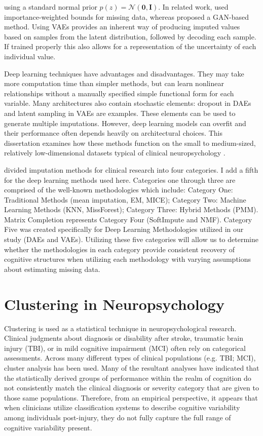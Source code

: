 using a standard normal prior $p(z)=\mathcal{N}(\mathbf{0},\mathbf{I})$. In related work, \parencite{mattei2019miwae} used importance-weighted bounds for missing data, whereas \parencite{yoon2018gain} proposed a GAN-based method. Using VAEs provides an inherent way of producing imputed values based on samples from the latent distribution, followed by decoding each sample. If trained properly this also allows for a representation of the uncertainty of each individual value.

Deep learning techniques have advantages and disadvantages. They may take more computation time than simpler methods, but can learn nonlinear relationships without a manually specified simple functional form for each variable. Many architectures also contain stochastic elements: dropout in DAEs and latent sampling in VAEs are examples. These elements can be used to generate multiple imputations. However, deep learning models can overfit and their performance often depends heavily on architectural choices. This dissertation examines how these methods function on the small to medium-sized, relatively low-dimensional datasets typical of clinical neuropsychology \parencite{prakash2024benchmarking}.

\parencite{afkanpour2024identify} divided imputation methods for clinical research into four categories. I add a fifth for the deep learning methods used here. Categories one through three are comprised of the well-known methodologies which include: Category One: Traditional Methods (mean imputation, EM, MICE); Category Two: Machine Learning Methods (KNN, MissForest); Category Three: Hybrid Methods (PMM). Matrix Completion represents Category Four (SoftImpute and NMF). Category Five was created specifically for Deep Learning Methodologies utilized in our study (DAEs and VAEs). Utilizing these five categories will allow us to determine whether the methodologies in each category provide consistent recovery of cognitive structures when utilizing each methodology with varying assumptions about estimating missing data.

\section{Clustering in Neuropsychology}
Clustering is used as a statistical technique in neuropsychological research. Clinical judgments about diagnosis or disability after stroke, traumatic brain injury (TBI), or in mild cognitive impairment (MCI) often rely on categorical assessments. Across many different types of clinical populations (e.g. TBI; MCI), cluster analysis has been used. Many of the resultant analyses have indicated that the statistically derived groups of performance within the realm of cognition do not consistently match the clinical diagnosis or severity category that are given to those same populations. Therefore, from an empirical perspective, it appears that when clinicians utilize classification systems to describe cognitive variability among individuals post-injury, they do not fully capture the full range of cognitive variability present.

